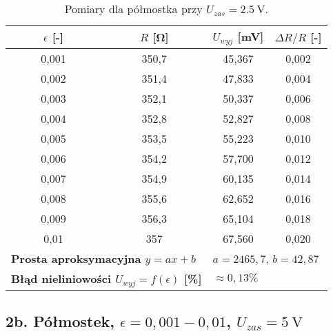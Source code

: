 \documentclass[12pt, a4paper]{article}
\begin{document}
	\begin{table}[H]
		\centering
		\caption{Pomiary dla półmostka przy $U_{zas} = \SI{2.5}{\volt}$.}
		\begin{tabular}{cccc}
			\toprule
			$\epsilon$ [-] & $R$ [\si{\ohm}] & $U_{wyj}$ [\si{\milli\volt}] & $\Delta R/R$ [-] \\
			\midrule
			0,001 & 350,7 & 45,367 & 0,002 \\
			0,002 & 351,4 & 47,833 & 0,004 \\
			0,003 & 352,1 & 50,337 & 0,006 \\
			0,004 & 352,8 & 52,827 & 0,008 \\
			0,005 & 353,5 & 55,223 & 0,010 \\
			0,006 & 354,2 & 57,700 & 0,012 \\
			0,007 & 354,9 & 60,135 & 0,014 \\
			0,008 & 355,6 & 62,652 & 0,016 \\
			0,009 & 356,3 & 65,104 & 0,018 \\
			0,01 & 357 & 67,560 & 0,020 \\
			\midrule
			\multicolumn{2}{l}{\textbf{Prosta aproksymacyjna $y = ax + b$}} & \multicolumn{2}{l}{$a = 2465,7$, $b = 42,87$} \\
			\multicolumn{2}{l}{\textbf{Błąd nieliniowości $U_{wyj} = f(\epsilon)$ [\%]}} & \multicolumn{2}{l}{$\approx 0,13 \%$} \\
			\bottomrule
		\end{tabular}
	\end{table}
	
	\subsection{2b. Półmostek, $\epsilon = 0,001-0,01$, $U_{zas} = \SI{5}{\volt}$}
	
\end{document}

